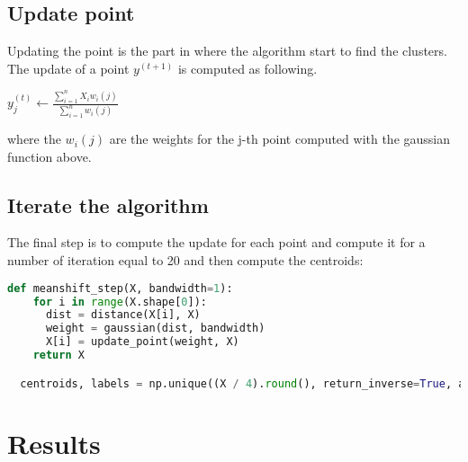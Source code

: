 \documentclass{ETHExercise}
\begin{document}
\subsection{Update point}
Updating the point is the part in where the algorithm start to find the clusters.
The update of a point $y^{(t+1)}$ is computed as following.

\begin{center}
  $y_j^{(t)} \leftarrow \frac{\sum\limits_{i=1}^{n}X_i w_i(j)}{\sum\limits_{i=1}^{n}w_i(j)}$
\end{center}

where the $w_i(j)$ are the weights for the j-th point computed with the gaussian function above.

\subsection{Iterate the algorithm}

The final step is to compute the update for each point and compute it for a number of iteration 
equal to 20 and then compute the centroids:

\begin{lstlisting}[language=Python, caption=Mean-shift]
  def meanshift_step(X, bandwidth=1):
    for i in range(X.shape[0]):
      dist = distance(X[i], X)
      weight = gaussian(dist, bandwidth)
      X[i] = update_point(weight, X)
    return X

  centroids, labels = np.unique((X / 4).round(), return_inverse=True, axis=0)

\end{lstlisting}


\section{Results}
\end{document}
